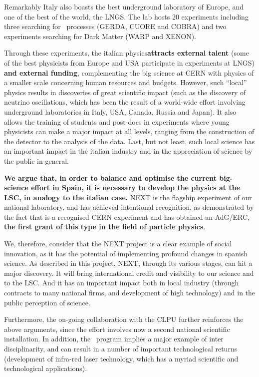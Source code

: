 Remarkably Italy also boasts the best underground laboratory of Europe, and one of the best of the world, the LNGS. The lab hosts 20 experiments including three searching for \bbonu\ processes (GERDA, CUORE and COBRA) and two experiments searching for Dark Matter (WARP and XENON). 

Through these experiments, the italian physics{\bf attracts external talent} (some of the best physicists from Europe and USA participate in experiments at LNGS) {\bf and external funding}, complementing the big science at CERN with physics of a smaller scale concerning human resources and budgets. However, such ``local'' physics results in discoveries of great scientific impact (such as the discovery of neutrino oscillations, which has been the result of a world-wide effort involving underground laboratories in Italy, USA, Canada, Russia and Japan). It also allows the training of students and post-docs in experiments where young physicists can make a major impact at all levels, ranging from the construction of the detector to the analysis of the data. Last, but not least, such local science has an important impact in the italian industry and in the appreciation of science by the public in general. 

{\bf We argue that, in order to balance and optimise the current big-science effort in Spain, it is necessary to develop the physics at the LSC, in analogy to the italian case.} NEXT is the flagship experiment of our national laboratory, and has achieved intentional recognition, as demonstrated by the fact that is a recognised CERN experiment and has obtained an AdG/ERC, {\bf the first grant of this type in the field of particle physics}. 

We, therefore, consider that the NEXT project is a clear example of social innovation, as it has the potential of implementing profound changes in spanish science. As described in this project, NEXT, through its various stages, can hit a major discovery. It will bring international credit and visibility to our science and to the LSC. And it has an important impact both in local industry (through contracts to many national firms, and development of high technology) and in the public perception of science. 

Furthermore, the on-going collaboration with the CLPU further reinforces the above arguments, since the effort involves now a second national scientific installation. In addition, the \BATA\ program implies a major example of inter disciplinarity, and can result in a number of important technological returns (development of infra-red laser technology, which has a myriad scientific and technological applications).

